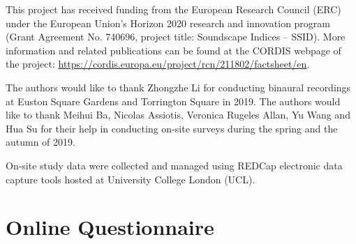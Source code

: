 \begin{acknowledgments}
This project has received funding from the European Research Council (ERC) under the European Union’s Horizon 2020 research and innovation program (Grant Agreement No. 740696, project title: Soundscape Indices – SSID). More information and related publications can be found at the CORDIS webpage of the project: \url{https://cordis.europa.eu/project/rcn/211802/factsheet/en}.

The authors would like to thank Zhongzhe Li for conducting binaural recordings at Euston Square Gardens and Torrington Square in 2019. The authors would like to thank Meihui Ba, Nicolas Assiotis, Veronica Rugeles Allan, Yu Wang and Hua Su for their help in conducting on-site surveys during the spring and the autumn of 2019.

On-site study data were collected and managed using REDCap electronic data capture tools hosted at University College London (UCL).

\end{acknowledgments}


\appendix
\section{Online Questionnaire}

